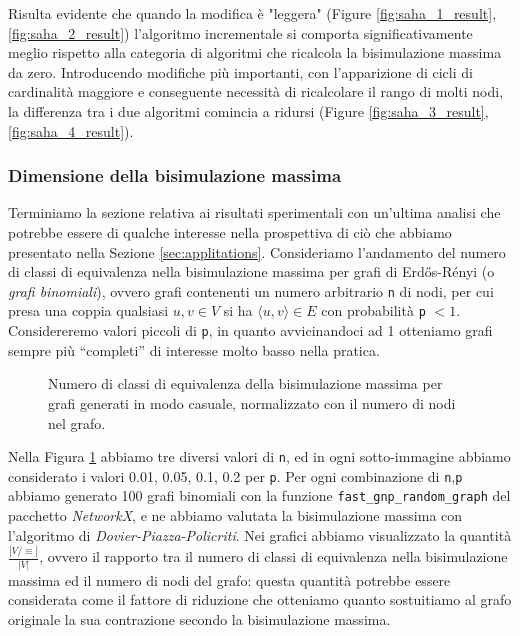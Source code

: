 Risulta evidente che quando la modifica è "leggera" (Figure \ref{fig:saha_1_result}, \ref{fig:saha_2_result}) l'algoritmo incrementale si comporta significativamente meglio rispetto alla categoria di algoritmi che ricalcola la bisimulazione massima da zero. Introducendo modifiche più importanti, con l'apparizione di cicli di cardinalità maggiore e conseguente necessità di ricalcolare il rango di molti nodi, la differenza tra i due algoritmi comincia a ridursi (Figure \ref{fig:saha_3_result}, \ref{fig:saha_4_result}).

\subsubsection{Dimensione della bisimulazione massima}
Terminiamo la sezione relativa ai risultati sperimentali con un'ultima analisi che potrebbe essere di qualche interesse nella prospettiva di ciò che abbiamo presentato nella Sezione \ref{sec:applitations}. Consideriamo l'andamento del numero di classi di equivalenza nella bisimulazione massima per grafi di Erdős-Rényi (o \emph{grafi binomiali}), ovvero grafi contenenti un numero arbitrario \verb|n| di nodi, per cui presa una coppia qualsiasi $u,v \in V$ si ha $\langle u,v\rangle \in E$ con probabilità \verb|p| $< 1$.
Considereremo valori piccoli di \verb|p|, in quanto avvicinandoci ad 1 otteniamo grafi sempre più ``completi'' di interesse molto basso nella pratica.

\begin{figure}[b!]
    \caption{Numero di classi di equivalenza della bisimulazione massima per grafi generati in modo casuale, normalizzato con il numero di nodi nel grafo.}
    \label{fig:bisi_size}
\end{figure}

Nella Figura \ref{fig:bisi_size} abbiamo tre diversi valori di \verb|n|, ed in ogni sotto-immagine abbiamo considerato i valori 0.01, 0.05, 0.1, 0.2 per \verb|p|. Per ogni combinazione di \verb|n|,\verb|p| abbiamo generato 100 grafi binomiali con la funzione \verb|fast_gnp_random_graph| del pacchetto \emph{NetworkX}, e ne abbiamo valutata la bisimulazione massima con l'algoritmo di \emph{Dovier-Piazza-Policriti}. Nei grafici abbiamo visualizzato la quantità $\frac{|V / \equiv|}{|V|}$, ovvero il rapporto tra il numero di classi di equivalenza nella bisimulazione massima ed il numero di nodi del grafo: questa quantità potrebbe essere considerata come il fattore di riduzione che otteniamo quanto sostuitiamo al grafo originale la sua contrazione secondo la bisimulazione massima.

